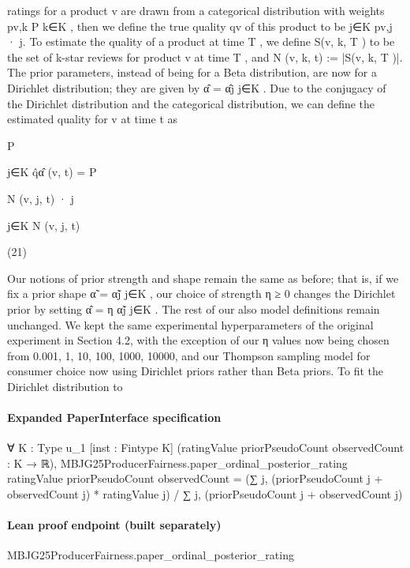 \documentclass[10pt]{article}
\begin{document}
\begin{ReviewVerbatim}
ratings for a product v are drawn from a categorical distribution with weights {pv,k }P
k∈K , then we define the true quality
qv of this product to be j∈K pv,j · j.
To estimate the quality of a product at time T , we define
S(v, k, T ) to be the set of k-star reviews for product v at
time T , and N (v, k, t) := |S(v, k, T )|. The prior parameters, instead of being for a Beta distribution, are now for a
Dirichlet distribution; they are given by α̂ = {α̂j }j∈K . Due
to the conjugacy of the Dirichlet distribution and the categorical distribution, we can define the estimated quality for
v at time t as

P

j∈K
q̂α̂ (v, t) = P

N (v, j, t) · j

j∈K N (v, j, t)

(21)

Our notions of prior strength and shape remain the same
as before; that is, if we fix a prior shape α̃ = {α̃j }j∈K ,
our choice of strength η ≥ 0 changes the Dirichlet prior
by setting α̂ = {η α̃j }j∈K . The rest of our also model definitions remain unchanged. We kept the same experimental
hyperparameters of the original experiment in Section 4.2,
with the exception of our η values now being chosen from
{0.001, 1, 10, 100, 1000, 10000}, and our Thompson sampling model for consumer choice now using Dirichlet priors rather than Beta priors. To fit the Dirichlet distribution to
\end{ReviewVerbatim}


\paragraph{Expanded PaperInterface specification}
\begin{ReviewVerbatim}
∀ {K : Type u_1} [inst : Fintype K] (ratingValue priorPseudoCount observedCount : K → ℝ),
  MBJG25ProducerFairness.paper_ordinal_posterior_rating ratingValue priorPseudoCount observedCount =
    (∑ j, (priorPseudoCount j + observedCount j) * ratingValue j) / ∑ j, (priorPseudoCount j + observedCount j)
\end{ReviewVerbatim}

\paragraph{Lean proof endpoint (built separately)}\begin{ReviewVerbatim}
MBJG25ProducerFairness.paper_ordinal_posterior_rating
\end{ReviewVerbatim}
\end{document}
